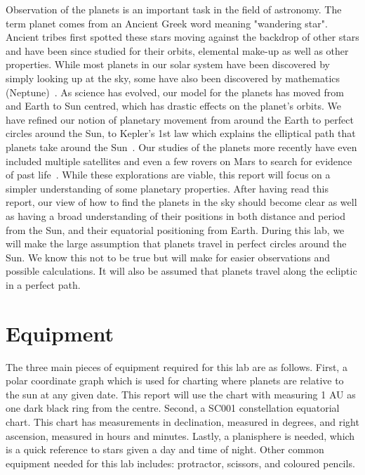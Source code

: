 \documentclass{article}
\begin{document}
Observation of the planets is an important task in the field of astronomy. The term planet comes from an Ancient Greek word
meaning "wandering star". Ancient tribes first spotted these stars moving against the backdrop of other stars and have been
since studied for their orbits, elemental make-up as well as other properties. While most planets in our solar system have been
discovered by simply looking up at the sky, some have also been discovered by mathematics (Neptune)~\cite{Edmund:2008}. 
As science has evolved, our model for the planets has moved from and Earth to Sun centred, which has drastic effects on the 
planet's orbits. We have refined our notion of planetary movement from around the Earth to perfect circles around the Sun,
to Kepler's 1st law which explains the elliptical path that planets take around the Sun~\cite{Holton:2009}. Our studies of the
planets more recently have even included multiple satellites and even a few rovers on Mars to search for evidence of past
life~\cite{NASA:2011}. While these explorations are viable, this report will focus on a simpler understanding of some planetary
properties.
After having read this report, our view of how to find the planets in the sky should become clear as well as having a broad 
understanding of their positions in both distance and period from the Sun, and their equatorial positioning from Earth.
During this lab, we will make the large assumption that planets travel in perfect circles around the Sun. We know this not
to be true but will make for easier observations and possible calculations. It will also be assumed that planets travel along
the ecliptic in a perfect path.\\


\section{Equipment}

The three main pieces of equipment required for this lab are as follows. First, a polar coordinate graph which is used for
charting where planets are relative to the sun at any given date. This report will use the chart with measuring 1 AU as 
one dark black ring from the centre. Second, a  SC001 constellation equatorial chart. This chart has measurements in declination, 
measured in degrees, and right ascension, measured in hours and minutes. Lastly, a planisphere is needed, which is a
quick reference to stars given a day and time of night. Other common equipment needed for this lab includes: protractor,
scissors, and coloured pencils.\\
\end{document}
